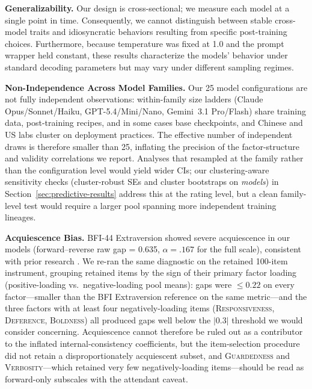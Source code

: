 \documentclass[11pt]{article}
\newcommand{\factorname}[1]{\textsc{#1}}
\begin{document}
\textbf{Generalizability.}
Our design is cross-sectional; we measure each model at a single point in time. Consequently, we cannot distinguish between stable cross-model traits and idiosyncratic behaviors resulting from specific post-training choices. Furthermore, because temperature was fixed at 1.0 and the prompt wrapper held constant, these results characterize the models' behavior under standard decoding parameters but may vary under different sampling regimes.

\textbf{Non-Independence Across Model Families.}
Our 25 model configurations are not fully independent observations: within-family size ladders (Claude Opus/Sonnet/Haiku, GPT-5.4/Mini/Nano, Gemini~3.1 Pro/Flash) share training data, post-training recipes, and in some cases base checkpoints, and Chinese and US labs cluster on deployment practices. The effective number of independent draws is therefore smaller than 25, inflating the precision of the factor-structure and validity correlations we report. Analyses that resampled at the family rather than the configuration level would yield wider CIs; our clustering-aware sensitivity checks (cluster-robust SEs and cluster bootstraps on \emph{models}) in Section~\ref{sec:predictive-results} address this at the rating level, but a clean family-level test would require a larger pool spanning more independent training lineages.

\textbf{Acquiescence Bias.}
BFI-44 Extraversion showed severe acquiescence in our models (forward--reverse raw gap = 0.635, $\alpha = .167$ for the full scale), consistent with prior research \citep{salecha2024social_desirability, dorner2023generalize}. We re-ran the same diagnostic on the retained 100-item instrument, grouping retained items by the sign of their primary factor loading (positive-loading vs.\ negative-loading pool means): gaps were $\leq 0.22$ on every factor---smaller than the BFI Extraversion reference on the same metric---and the three factors with at least four negatively-loading items (\factorname{Responsiveness}, \factorname{Deference}, \factorname{Boldness}) all produced gaps well below the $|0.3|$ threshold we would consider concerning. Acquiescence cannot therefore be ruled out as a contributor to the inflated internal-consistency coefficients, but the item-selection procedure did not retain a disproportionately acquiescent subset, and \factorname{Guardedness} and \factorname{Verbosity}---which retained very few negatively-loading items---should be read as forward-only subscales with the attendant caveat.
\end{document}
